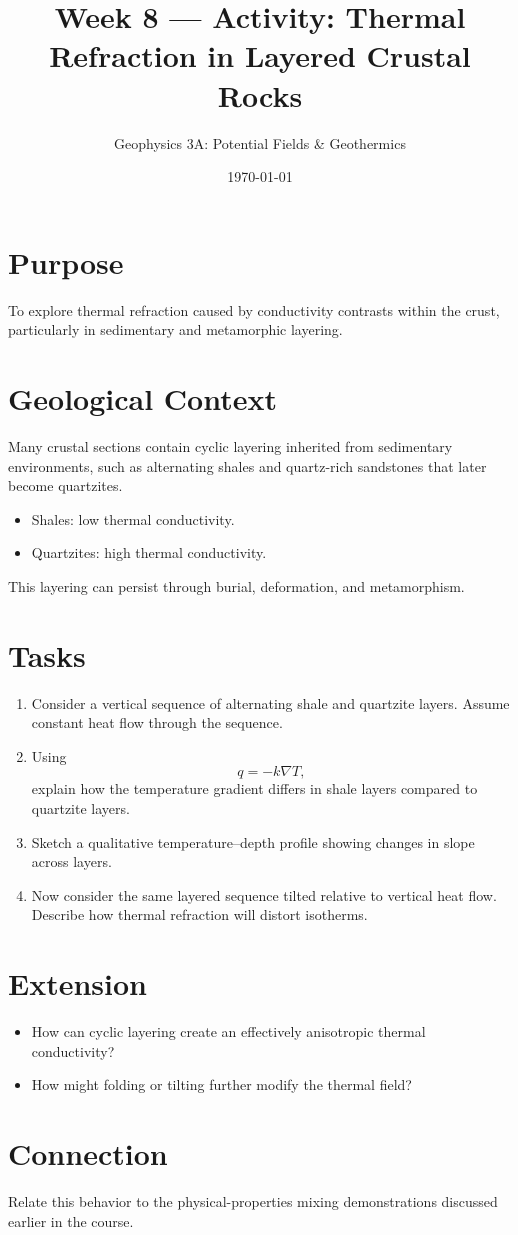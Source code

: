 \documentclass[11pt,a4paper]{article}
\title{Week 8 --- Activity: Thermal Refraction in Layered Crustal Rocks}
\author{Geophysics 3A: Potential Fields \& Geothermics}
\date{\today}
\begin{document}
\maketitle

\section*{Purpose}
To explore thermal refraction caused by conductivity contrasts within the crust, particularly in sedimentary and metamorphic layering.

\section*{Geological Context}
Many crustal sections contain cyclic layering inherited from sedimentary
environments, such as alternating shales and quartz-rich sandstones that later
become quartzites.

\begin{itemize}
  \item Shales: low thermal conductivity.
  \item Quartzites: high thermal conductivity.
\end{itemize}

This layering can persist through burial, deformation, and metamorphism.

\section*{Tasks}
\begin{enumerate}
  \item Consider a vertical sequence of alternating shale and quartzite layers.
  Assume constant heat flow through the sequence.

  \item Using
  \[
    q = -k \nabla T,
  \]
  explain how the temperature gradient differs in shale layers compared to quartzite layers.

  \item Sketch a qualitative temperature--depth profile showing changes in slope across layers.

  \item Now consider the same layered sequence tilted relative to vertical heat flow. Describe how thermal refraction will distort isotherms.
\end{enumerate}

\section*{Extension}
\begin{itemize}
  \item How can cyclic layering create an effectively anisotropic thermal conductivity?
  \item How might folding or tilting further modify the thermal field?
\end{itemize}

\section*{Connection}
Relate this behavior to the physical-properties mixing demonstrations discussed earlier in the course.
\end{document}
